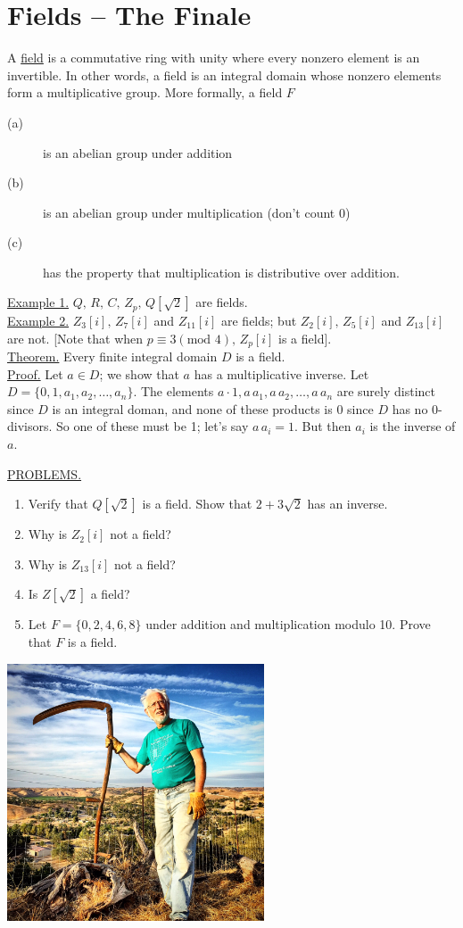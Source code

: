\documentclass[12pt]{book}
\theoremstyle{definition}
\begin{document}
\section{Fields -- The Finale}

\quad A \underline{field} is a commutative ring with unity where every nonzero element is an invertible.  In other words, a field is an integral domain whose nonzero elements form a multiplicative group.  More formally, a field $F$
\begin{description}
\item[\quad(a)] is an abelian group under addition
\item[\quad(b)] is an abelian group under multiplication (don't count 0)
\item[\quad(c)] has the property that multiplication is distributive over addition.
\end{description}
\underline{Example 1.} $Q,\,R,\,C,\,Z_p,\, Q[\sqrt2]$ are fields.\\
\underline{Example 2.} $Z_3[i],\, Z_7[i]$ and $Z_{11}[i]$ are fields; but $Z_2[i],\, Z_5[i]$ and $Z_{13}[i]$ are not. [Note that when $p\equiv3(\text{mod }4),\, Z_p[i]$ is a field].\\[.1in]
%
\underline{Theorem.} Every finite integral domain $D$ is a field.\\
\underline{Proof.} Let $a\in D$; we show that $a$ has a multiplicative inverse. Let $D=\{0,1,a_1,a_2, \dots, a_n\}$.  The elements $a\cdot1, a\,a_1, a\,a_2, \dots, a\,a_n$ are surely distinct since $D$ is an integral doman, and none of these products is 0 since $D$ has no 0-divisors.  So one of these must be 1; let's say $a\,a_i=1$.  But then $a_i$ is the inverse of $a$.

\underline{PROBLEMS.}
\begin{enumerate}
\item Verify that $Q[\sqrt2]$ is a field.  Show that $2+3\sqrt2$ has an inverse.
\item Why is $Z_2[i]$ not a field?
\item Why is $Z_{13}[i]$ not a field?
\item Is $Z[\sqrt2]$ a field?
\item Let $F=\{0,2,4,6,8\}$ under addition and multiplication modulo 10.  Prove that $F$ is a field.
\end{enumerate}
\vfill
\centerline{\includegraphics[width=3in]{IMG_0454.JPG}}
\vfill
\end{document}
